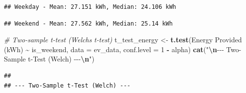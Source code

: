 \documentclass[
  12pt,
]{article}
\newenvironment{Shaded}{\begin{snugshade}}{\end{snugshade}}
\newcommand{\AttributeTok}[1]{\textcolor[rgb]{0.13,0.29,0.53}{#1}}
\newcommand{\CommentTok}[1]{\textcolor[rgb]{0.56,0.35,0.01}{\textit{#1}}}
\newcommand{\DecValTok}[1]{\textcolor[rgb]{0.00,0.00,0.81}{#1}}
\newcommand{\FunctionTok}[1]{\textcolor[rgb]{0.13,0.29,0.53}{\textbf{#1}}}
\newcommand{\NormalTok}[1]{#1}
\newcommand{\OtherTok}[1]{\textcolor[rgb]{0.56,0.35,0.01}{#1}}
\newcommand{\SpecialCharTok}[1]{\textcolor[rgb]{0.81,0.36,0.00}{\textbf{#1}}}
\newcommand{\StringTok}[1]{\textcolor[rgb]{0.31,0.60,0.02}{#1}}
\begin{document}
\begin{verbatim}
## Weekday - Mean: 27.151 kWh, Median: 24.106 kWh
\end{verbatim}

\begin{Shaded}
\end{Shaded}

\begin{verbatim}
## Weekend - Mean: 27.562 kWh, Median: 25.14 kWh
\end{verbatim}

\begin{Shaded}
\begin{Highlighting}[]
\CommentTok{\# Two{-}sample t{-}test (Welch\textquotesingle{}s t{-}test)}
\NormalTok{t\_test\_energy }\OtherTok{\textless{}{-}} \FunctionTok{t.test}\NormalTok{(}\StringTok{\textasciigrave{}}\AttributeTok{Energy Provided (kWh)}\StringTok{\textasciigrave{}} \SpecialCharTok{\textasciitilde{}}\NormalTok{ is\_weekend,}
    \AttributeTok{data =}\NormalTok{ ev\_data, }\AttributeTok{conf.level =} \DecValTok{1} \SpecialCharTok{{-}}\NormalTok{ alpha)}
\FunctionTok{cat}\NormalTok{(}\StringTok{"}\SpecialCharTok{\textbackslash{}n}\StringTok{{-}{-}{-} Two{-}Sample t{-}Test (Welch) {-}{-}{-}}\SpecialCharTok{\textbackslash{}n}\StringTok{"}\NormalTok{)}
\end{Highlighting}
\end{Shaded}

\begin{verbatim}
## 
## --- Two-Sample t-Test (Welch) ---
\end{verbatim}

\begin{Shaded}
\end{Shaded}
\end{document}
